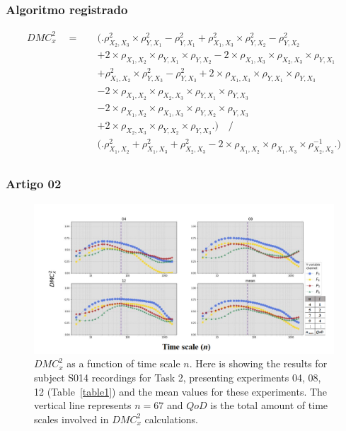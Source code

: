 \documentclass[11pt, aspectratio=169]{beamer}
\begin{document}
\begin{frame}
  \frametitle{Algoritmo registrado}

  \begin{equation}
    \begin{split}
      DMC_{x}^{2} \quad = \quad & \Big( \Big. \rho^{2}_{X_{2},X_{3}} \times \rho^{2}_{Y,X_{1}}- \rho^{2}_{Y,X_{1}} + \rho^{2}_{X_{1},X_{3}}\times \rho^{2}_{Y,X_{2}}-\rho^{2}_{Y,X_{2}} \\
      &+ 2 \times \rho_{X_{1},X_{2}} \times \rho_{Y,X_{1}} \times \rho_{Y,X_{2}}   - 2 \times \rho_{X_{1},X_{3}} \times \rho_{X_{2},X_{3}} \times \rho_{Y,X_{1}} \\
      &+ \rho^{2}_{X_{1},X_{2}} \times \rho^{2}_{Y,X_{3}}-\rho^{2}_{Y,X_{3}} + 2 \times \rho_{X_{1},X_{3}} \times \rho_{Y,X_{1}} \times \rho_{Y,X_{3}} \\
      &- 2 \times \rho_{X_{1},X_{2}} \times \rho_{X_{2},X_{3}} \times \rho_{Y,X_{1}} \times \rho_{Y,X_{3}} \\
      &- 2 \times \rho_{X_{1},X_{2}} \times \rho_{X_{1},X_{3}} \times \rho_{Y,X_{2}} \times \rho_{Y,X_{3}} \\
      &+ 2 \times \rho_{X_{2},X_{3}} \times \rho_{Y,X_{2}} \times \rho_{Y,X_{3}} \Big. \Big)    \quad \Big/ \\
      & \Big( \Big. \rho^{2}_{X_{1},X_{2}} + \rho^{2}_{X_{1},X_{3}} + \rho^{2}_{X_{2},X_{3}} - 2 \times \rho_{X_{1},X_{2}} \times \rho_{X_{1},X_{3}} \times \rho_{X_{2},X_{3}}^{-1}\Big. \Big)  \\
    \end{split}
    \label{eq:dmc_3x_y}
  \end{equation}

\end{frame}


\begin{frame}
  \frametitle{Artigo 02}

  \begin{figure}[!h]
    \includegraphics[height=.5\paperheight]{../Figures/art_02/Fig2.png}
    \caption{$DMC_{x}^{2}$ as a function of time scale $n$. Here is showing the results for subject S014 recordings for Task 2, presenting experiments 04, 08, 12 (Table~\ref{table1}) and the mean values for these experiments. The vertical line represents $n=67$ and $QoD$ is the total amount of time scales involved in $DMC_{x}^{2}$ calculations.}
    \label{fig02}
  \end{figure}
\end{frame}
\end{document}
